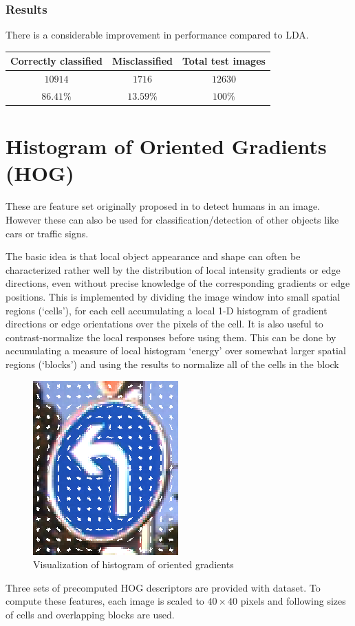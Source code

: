 \documentclass[a4paper]{article}
\begin{document}
\subsubsection{Results}
There is a considerable improvement in performance compared to LDA.
\begin{center}
\begin{tabular}{ |c|c|c| } 
 \hline
 Correctly classified & Misclassified & Total test images \\ 
 \hline
 $10914$ & $1716$ & $12630$ \\ 
 \hline
 $86.41 \%$ & $13.59 \%$ & $100 \%$ \\ 
 \hline
\end{tabular}
\end{center}

\section{Histogram of Oriented Gradients (HOG) \cite{hog}}
These are feature set originally proposed in \cite{hog} to detect humans in an image. However these can also be used for classification/detection of other objects like cars or traffic signs.

The basic idea is that local object appearance and shape can often be characterized rather well by the distribution of local intensity gradients or edge directions, even without precise knowledge of the corresponding gradients or edge positions. 
This is implemented by dividing the image window into small spatial regions (`cells'), for each cell accumulating a local 1-D histogram of gradient directions or edge orientations over the pixels of the cell. It is also useful to contrast-normalize the local responses before using them. This can be done by accumulating a measure of local histogram `energy' over somewhat larger spatial regions (`blocks') and using the results to normalize all of the cells in the block

\begin{figure}[h]
\centering
\includegraphics[scale = 0.75]{hog1.png}
\caption{Visualization of histogram of oriented gradients}
\end{figure}
Three sets of precomputed HOG descriptors are provided with dataset. To compute these features, each image is scaled to $40 \times 40$ pixels and following sizes of cells and overlapping blocks are used.
\end{document}
